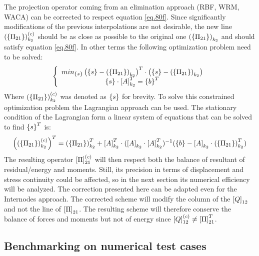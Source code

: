 The projection operator coming from an elimination approach (RBF, WRM, WACA) can be corrected to respect equation \eqref{eq.80f}. Since significantly modifications of the previous interpolations are not desirable, the new line  $ \left(\left\lbrace{\Pi_{21}}\right \rbrace\right)_{k_2}^{(c)}$ should be as close as possible to the original one  $ \left(\left\lbrace{\Pi_{21}}\right \rbrace\right)_{k_2}$ and should satisfy equation \eqref{eq.80f}. In other terms the following optimization problem need to be solved:
 \begin{equation}
 \label{eq.80g}
\left\lbrace \begin{array}{c}
 min_{\left\lbrace{s}\right \rbrace}\left(\left\lbrace{s}\right \rbrace-\left(\left\lbrace{\Pi_{21}}\right \rbrace\right)_{k_2} \right)^T\cdot\left(\left\lbrace{s}\right \rbrace-\left(\left\lbrace{\Pi_{21}}\right \rbrace\right)_{k_2} \right)\\
 \left\lbrace{s}\right \rbrace\cdot\left[{A}\right]_{k_2}^T=\left\lbrace{b}\right \rbrace^T
 \end{array} \right.
 \end{equation}
 Where $ \left(\left\lbrace{\Pi_{21}}\right \rbrace\right)_{k_2}^{(c)}$ was denoted as $\left\lbrace{s}\right \rbrace$ for brevity. To solve this constrained optimization problem the Lagrangian approach can be used. The stationary condition of the Lagrangian form a linear system of equations that can be solved to find  $\left\lbrace{s}\right \rbrace^T$ is:
 \begin{equation}
 \label{eq.80h}
\left(\left(\left\lbrace{\Pi_{21}}\right \rbrace\right)_{k_2}^{(c)}\right)^T=\left(\left\lbrace{\Pi_{21}}\right \rbrace\right)_{k_2}^T+\left[{A}\right]_{k_2}^T\cdot(\left[{A}\right]_{k_2}\cdot\left[{A}\right]_{k_2}^T)^{-1}(\left\lbrace{b}\right \rbrace-\left[{A}\right]_{k_2}\cdot\left(\left\lbrace{\Pi_{21}}\right \rbrace\right)_{k_2}^T)
 \end{equation}
 The resulting operator $\left[{\Pi}\right]_{21}^{(c)}$ will then respect both the balance of resultant of residual/energy and moments. Still, its precision in terms of displacement and stress continuity could be affected, so in the next section its numerical efficiency will be analyzed. The correction presented here can be adapted even for the Internodes approach. The corrected scheme will modify the column of the $\left[{Q}\right]_{12}$ and not the line of $\left[{\Pi}\right]_{21}$. The resulting scheme will therefore conserve the balance  of forces and moments but not of energy since $\left[{Q}\right]_{12}^{(c)}\neq\left[{\Pi}\right]_{21}^T$.
 \subsection{Benchmarking on numerical test cases}\label{sec4}
